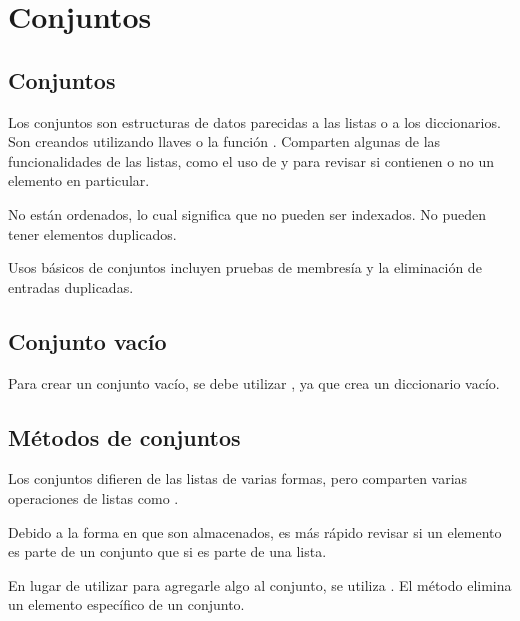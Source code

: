 \chapter{Conjuntos}

\section{Conjuntos}

Los conjuntos son estructuras de datos parecidas a las listas o a los diccionarios.
Son creandos utilizando llaves \ttt{\{\}}o la función .
Comparten algunas de las funcionalidades de las listas, como el uso de  y  para revisar si contienen o no un elemento en particular.


No están ordenados, lo cual significa que no pueden ser indexados.
No pueden tener elementos duplicados.


Usos básicos de conjuntos incluyen pruebas de membresía y la eliminación de entradas duplicadas.

\section{Conjunto vacío}

Para crear un conjunto vacío, se debe utilizar , ya que \ttt{\{\}} crea un diccionario vacío.


\section{Métodos de conjuntos}

Los conjuntos difieren de las listas de varias formas, pero comparten varias operaciones de listas como .


Debido a la forma en que son almacenados, es más rápido revisar si un elemento es parte de un conjunto que si es parte de una lista.

En lugar de utilizar  para agregarle algo al conjunto, se utiliza .
El método  elimina un elemento específico de un conjunto.

